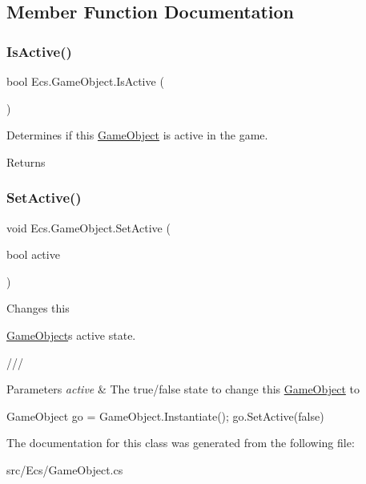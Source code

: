 \subsection{Member Function Documentation}
\mbox{\label{class_ecs_1_1_game_object_aa6bc70dfeda488ed71b536346d29881b}} 
\subsubsection{\texorpdfstring{Is\+Active()}{IsActive()}}
{\footnotesize\ttfamily bool Ecs.\+Game\+Object.\+Is\+Active (\begin{DoxyParamCaption}{ }\end{DoxyParamCaption})}



Determines if this \mbox{\hyperlink{class_ecs_1_1_game_object}{Game\+Object}} is active in the game. 

\begin{DoxyReturn}{Returns}

\end{DoxyReturn}
\mbox{\label{class_ecs_1_1_game_object_af4211e4cb1df45aa6692a5c2de79ef53}} 
\subsubsection{\texorpdfstring{Set\+Active()}{SetActive()}}
{\footnotesize\ttfamily void Ecs.\+Game\+Object.\+Set\+Active (\begin{DoxyParamCaption}\item[{bool}]{active }\end{DoxyParamCaption})}



Changes this 

{\ttfamily \mbox{\hyperlink{class_ecs_1_1_game_object}{Game\+Object}}\textquotesingle{}s} active state. 

/// 
\begin{DoxyParams}{Parameters}
{\em active} & The true/false state to change this \mbox{\hyperlink{class_ecs_1_1_game_object}{Game\+Object}} to\\
\hline
\end{DoxyParams}



\begin{DoxyCode}
GameObject go = GameObject.Instantiate();
go.SetActive(\textcolor{keyword}{false})
\end{DoxyCode}
 

The documentation for this class was generated from the following file\+:\begin{DoxyCompactItemize}
\item 
src/\+Ecs/Game\+Object.\+cs\end{DoxyCompactItemize}
